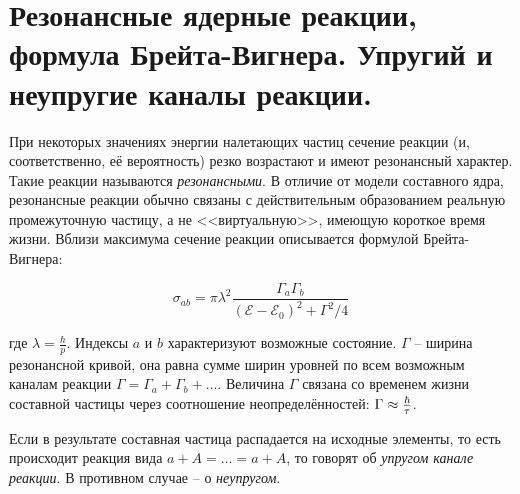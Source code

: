 \section{Резонансные ядерные реакции, формула Брейта-Вигнера. Упругий и неупругие каналы реакции.}

При некоторых значениях энергии налетающих частиц сечение реакции (и, соответственно, её вероятность) резко возрастают и имеют резонансный характер. Такие реакции называются \textit{резонансными}. В отличие от модели составного ядра, резонансные реакции обычно связаны с действительным образованием реальную промежуточную частицу, а не <<виртуальную>>, имеющую короткое время жизни. Вблизи максимума сечение реакции описывается формулой Брейта-Вигнера:

\begin{equation}
    \sigma_{a b} = \pi \lambda^2 \frac{\Gamma_a \Gamma_b}{(\mathcal{E} - \mathcal{E}_0)^2 + \Gamma^2 / 4}
\end{equation}

\noindent
где $\lambda = \frac{\hbar}{p}$. Индексы $a$ и $b$ характеризуют возможные состояние. $\Gamma$ -- ширина резонансной кривой, она равна сумме ширин уровней по всем возможным каналам реакции $\Gamma = \Gamma_a + \Gamma_b + \dots$. Величина $\Gamma$ связана со временем жизни составной частицы через соотношение неопределённостей: $\Gamma \approx \frac{\hbar}{\tau}$.

Если в результате составная частица распадается на исходные элементы, то есть происходит реакция вида $a + A = \dots = a + A$, то говорят об \textit{упругом канале реакции}. В противном случае -- о \textit{неупругом}.